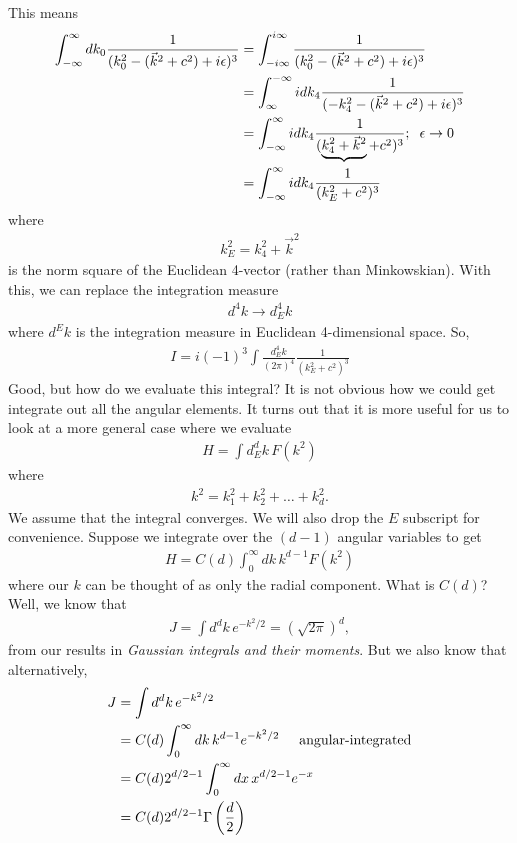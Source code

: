 \documentclass{book}
\theoremstyle{definition}
\newcommand{\f}[2]{\frac{#1}{#2}}
\newcommand{\lp}{\left(}
\newcommand{\rp}{\right)}
\begin{document}
This means
\begin{align}
\int^\infty_{-\infty} dk_0 \f{1}{(k_0^2 - (\vec{k}^2 + c^2)+ i\epsilon)^3} &= \int^{i\infty}_{-i\infty}\f{1}{(k_0^2 - (\vec{k}^2 + c^2)+ i\epsilon)^3} \nonumber\\
&= \int^{-\infty}_{\infty}idk_4\f{1}{(-k_4^2 - (\vec{k}^2 + c^2)+ i\epsilon)^3} \nonumber\\
&= \int^{\infty}_{-\infty}idk_4\f{1}{(\underbrace{k_4^2 + \vec{k}^2} + c^2)^3}; \hspace{0.2cm}\epsilon\to 0 \nonumber\\
&= \int^{\infty}_{-\infty}idk_4\f{1}{(k^2_E + c^2)^3}
\end{align}
where 
\begin{align}
k^2_E = k_4^2 + \vec{k}^2
\end{align}
is the norm square of the Euclidean 4-vector (rather than Minkowskian). With this, we can replace the integration measure
\begin{align}
d^4k \to d^4_Ek
\end{align}
where $d^E k$ is the integration measure in Euclidean 4-dimensional space. So,
\begin{align}
\boxed{I = i(-1)^3\int \f{d^4_E k}{(2\pi)^4} \f{1}{(k^2_E + c^2)^3}}
\end{align}
Good, but how do we evaluate this integral? It is not obvious how we could get integrate out all the angular elements. It turns out that it is more useful for us to look at a more general case where we evaluate
\begin{align}
H = \int d^d_Ek \, F(k^2)
\end{align}
where
\begin{align}
k^2 = k_1^2 + k_2^2 + \dots + k^2_d.
\end{align}
We assume that the integral converges. We will also drop the $E$ subscript for convenience. Suppose we integrate over the $(d-1)$ angular variables to get
\begin{align}
H = C(d)\int^\infty_0 dk\,k^{d-1}F(k^2)
\end{align}
where our $k$ can be thought of as only the radial component. What is $C(d)$? Well, we know that
\begin{align}
J = \int d^dk\, e^{-k^2/2} = \lp\sqrt{2\pi}\rp^d,
\end{align}
from our results in \textit{Gaussian integrals and their moments}. But we also know that alternatively,
\begin{align}
J &= \int d^dk\, e^{-k^2/2}\nonumber\\
&= C(d) \int^\infty_0 dk\, k^{d-1}e^{-k^2/2} \hspace{0.5cm}\text{angular-integrated} \nonumber\\
&= C(d) 2^{d/2 - 1} \int^\infty_0 dx\, x^{d/2 - 1}e^{-x} \nonumber\\
&= C(d) 2^{d/2 - 1} \Gamma\lp \f{d}{2} \rp
\end{align}
\end{document}
